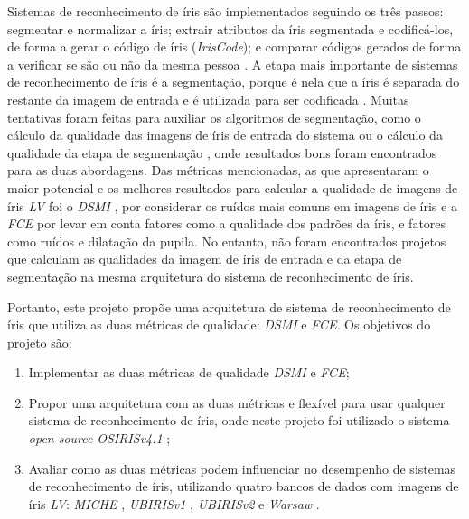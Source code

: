 \par Sistemas de reconhecimento de íris são implementados seguindo os três passos: segmentar e normalizar a íris; extrair atributos da íris segmentada e codificá-los, de forma a gerar o código de íris (\textit{IrisCode}); e comparar códigos gerados de forma a verificar se são ou não da mesma pessoa \cite{wayman2005biometric}. A etapa mais importante de sistemas de reconhecimento de íris é a segmentação, porque é nela que a íris é separada do restante da imagem de entrada e é utilizada para ser codificada \cite{daugman2004}. Muitas tentativas foram feitas para auxiliar os algoritmos de segmentação, como o cálculo da qualidade das imagens de íris de entrada do sistema \cite{Jenadeleh_2018_CVPR_Workshops, daugman2004, starovoitov2013-DSMI-45, wan2007-DSMI-50, bergmller2017-DSMI-2, chen2013-DSMI-4, kalka2010-DSMI-18, li2011} ou o cálculo da qualidade da etapa de segmentação \cite{du2010, belcher2008, proenca2011, mottalli2009-DSMI-30, ma2003-FIM-7}, onde resultados bons foram encontrados para as duas abordagens. Das métricas mencionadas, as que apresentaram o maior potencial e os melhores resultados para calcular a qualidade de imagens de íris \textit{\acrshort{LV}} foi o \textit{\acrfull{DSMI}} \cite{Jenadeleh_2018_CVPR_Workshops}, por considerar os ruídos mais comuns em imagens de íris e a \textit{\acrfull{FCE}} \cite{du2010} por levar em conta fatores como a qualidade dos padrões da íris, e fatores como ruídos e dilatação da pupila. No entanto, não foram encontrados projetos que calculam as qualidades da imagem de íris de entrada e da etapa de segmentação na mesma arquitetura do sistema de reconhecimento de íris.

\par Portanto, este projeto propõe uma arquitetura de sistema de reconhecimento de íris que utiliza as duas métricas de qualidade: \textit{\acrshort{DSMI}} e \textit{\acrshort{FCE}}. Os objetivos do projeto são:

\begin{enumerate}
    \item Implementar as duas métricas de qualidade \textit{\acrshort{DSMI}} e \textit{\acrshort{FCE}};
    \item Propor uma arquitetura com as duas métricas e flexível para usar qualquer sistema de reconhecimento de íris, onde neste projeto foi utilizado o sistema \textit{open source} \textit{OSIRISv4.1} \cite{othman2015};
    \item Avaliar como as duas métricas podem influenciar no desempenho de sistemas de reconhecimento de íris, utilizando quatro bancos de dados com imagens de íris \textit{\acrshort{LV}}: \textit{MICHE} \cite{marsico2017-MICHE-1}, \textit{UBIRISv1} \cite{proenca2005-ubirisv1}, \textit{UBIRISv2} \cite{proence2010-ubirisv2} e \textit{\acrfull{Warsaw}} \cite{trokielwicz2016-Warsaw}.
\end{enumerate}

